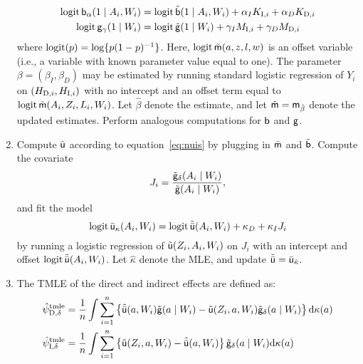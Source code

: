 \begin{enumerate}[label=Step \arabic*., align=left, leftmargin=*]
\begin{align*}
    \operatorname{logit} \mathsf{b}_\alpha(1\mid A_i,W_i) &= \operatorname{logit} \tilde
                                      {\mathsf{b}}(1\mid A_i,W_i) + \alpha_I K_{\mbox{\scriptsize I}, i} +
                                      \alpha_D K_{\mbox{\scriptsize
                                      D}, i}\\
    \operatorname{logit} \mathsf{g}_\gamma(1\mid W_i) &= \operatorname{logit} \tilde
                                  {\mathsf{g}}(1\mid W_i) + \gamma_I M_{\mbox{\scriptsize I}, i} +
                                  \gamma_D M_{\mbox{\scriptsize D}, i}
  \end{align*}
  where
  $\operatorname{logit}(p) = \log\{p(1-p)^{-1}\}$. Here, $\operatorname{logit} \tilde{\mathsf{m}}(a,z,l,w)$
  is an offset variable (i.e., a variable with known parameter value
  equal to one). The parameter $\beta=(\beta_I, \beta_D)$ may be
  estimated by running standard logistic regression of $Y_i$ on
  $(H_{\mbox{\scriptsize D}, i}, H_{\mbox{\scriptsize I}, i})$ with no
  intercept and an offset term equal to
  $\operatorname{logit} \tilde{\mathsf{m}}(A_i,Z_i,L_i,W_i)$. Let $\hat\beta$ denote the
  estimate, and let $\tilde {\mathsf{m}}=\mathsf{m}_{\hat\beta}$ denote the updated
  estimates. Perform analogous computations for $\mathsf{b}$ and $\mathsf{g}$.
\item \label{step:computeu} Compute $\tilde{\mathsf{u}}$ according to
   equation~\eqref{eq:nuis} by plugging in $\tilde{\mathsf{m}}$ and $\tilde{\mathsf{b}}$. Compute
  the covariate
  \[J_i = \frac{{\tilde{\mathsf{g}}}_\delta(A_i
      \mid W_i)}{{\tilde{\mathsf{g}}}(A_i\mid W_i)},\]
  and fit the model
  \[\operatorname{logit} \bar{\mathsf{u}}_\kappa(A_i,W_i) = \operatorname{logit} \tilde{\bar{\mathsf{u}}}(A_i,W_i) +
    \kappa_D + \kappa_I J_{ i}\] by running a logistic regression of
  $\tilde{\mathsf{u}}(Z_i,A_i,W_i)$ on $J_i$ with an intercept and offset
  $\operatorname{logit} \tilde{\bar{\mathsf{u}}}(A_i,W_i)$. Let $\hat\kappa$ denote the MLE,
  and update $\tilde{\bar{\mathsf{u}}} = \bar{\mathsf{u}}_{\hat \kappa}$.
\item The TMLE of the direct and indirect effects are defined as:
  \begin{equation*}
    \begin{split}
      \hat\psi_{\mbox{\scriptsize D}, \delta}^{\mbox{\scriptsize tmle}} &= \frac{1}{n} \int\sum_{i = 1}^n
      \left\{\tilde{\bar{\mathsf{u}}}(a,W_i)\tilde{\mathsf{g}}(a\mid W_i) -
        \tilde{\mathsf{u}}(Z_i,a,W_i)\tilde{\mathsf{g}}_\delta(a\mid W_i)\right\}\mathrm{d}\kappa(a)\\
      \hat\psi_{\mbox{\scriptsize I}, \delta}^{\mbox{\scriptsize tmle}} &= \frac{1}{n} \int\sum_{i = 1}^n
      \left\{\tilde{\mathsf{u}}(Z_i,a,W_i) -
        \tilde{\bar{\mathsf{u}}}(a,W_i)\right\}\tilde{\mathsf{g}}_\delta(a\mid
      W_i)\mathrm{d}\kappa(a)
    \end{split}
  \end{equation*}
\end{enumerate}

